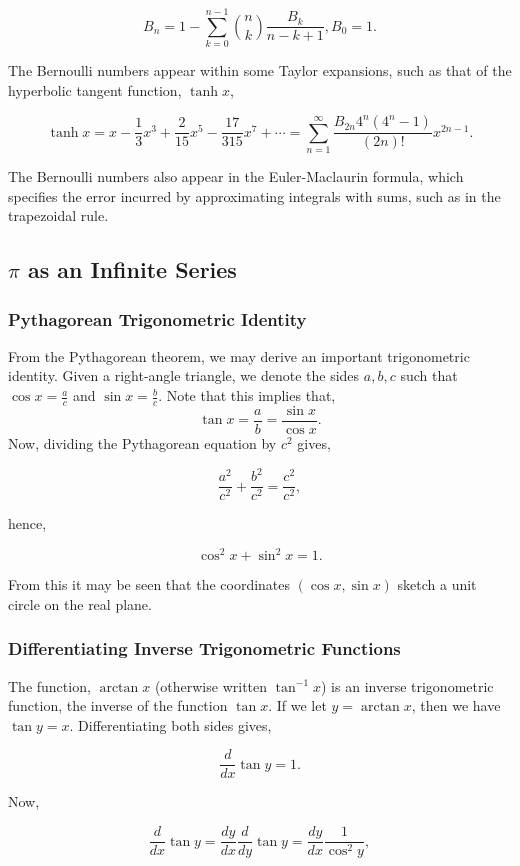 \documentclass[11pt]{amsart}
\begin{document}
$$B_n = 1 - \sum_{k=0}^{n-1}{{{n}\choose{k}}}\frac{B_k}{n - k + 1}, B_0 = 1.$$

The Bernoulli numbers appear within some Taylor expansions, such as that of the hyperbolic tangent function, $\tanh x$,

$$\tanh x = x - \frac{1}{3}x^3 + \frac{2}{15}x^5 - \frac{17}{315}x^7 + \cdots = \sum_{n=1}^{\infty}\frac{B_{2n}4^n(4^n-1)}{(2n)!}x^{2n-1}.$$

The Bernoulli numbers also appear in the Euler-Maclaurin formula, which specifies the error incurred by approximating integrals with sums, such as in the trapezoidal rule.

\subsection{$\pi$ as an Infinite Series}

\subsubsection{Pythagorean Trigonometric Identity}

From the Pythagorean theorem, we may derive an important trigonometric identity. Given a right-angle triangle, we denote the sides $a, b, c$ such that $\cos{x} = \frac{a}{c}$ and $\sin{x} = \frac{b}{c}$. Note that this implies that, $$\tan{x} = \frac{a}{b} = \frac{\sin{x}}{\cos{x}}.$$ Now, dividing the Pythagorean equation by $c^2$ gives,

$$\frac{a^2}{c^2} + \frac{b^2}{c^2} = \frac{c^2}{c^2},$$

hence,

$$\cos^2x + \sin^2x = 1.$$

From this it may be seen that the coordinates $(\cos x, \sin x)$ sketch a unit circle on the real plane.

\subsubsection{Differentiating Inverse Trigonometric Functions}

The function, $\arctan x$ (otherwise written $\tan^{-1}x$) is an inverse trigonometric function, the inverse of the function $\tan{x}$. If we let $y = \arctan{x}$, then we have $\tan{y} = x$. Differentiating both sides gives,

$$\frac{d}{dx} \tan{y} = 1.$$

Now,

$$\frac{d}{dx} \tan{y} = \frac{dy}{dx}\frac{d}{dy}\tan{y} = \frac{dy}{dx} \frac{1}{\cos^2{y}},$$
\end{document}
